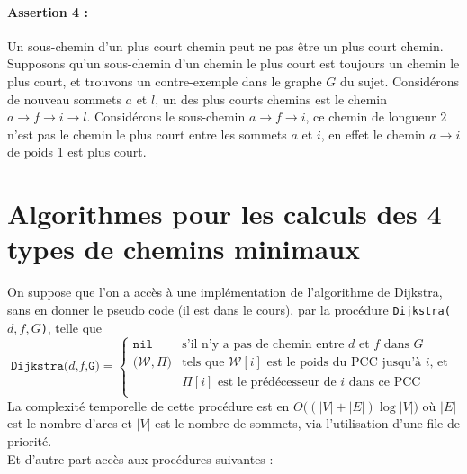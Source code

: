 \documentclass{article}
\begin{document}
\paragraph{Assertion 4 : } Un sous-chemin d'un plus court chemin peut ne pas
être un plus court chemin. \\
Supposons qu'un sous-chemin d'un chemin le plus court est toujours un chemin le
plus court, et trouvons un contre-exemple dans le graphe $G$ du sujet.
Considérons de nouveau sommets $a$ et $l$, un des plus courts chemins est le
chemin $a \rightarrow f \rightarrow i \rightarrow l$. Considérons le sous-chemin
$a \rightarrow f \rightarrow i$, ce chemin de longueur $2$ n'est pas le chemin
le plus court entre les sommets $a$ et $i$, en effet le chemin $a \rightarrow i$
de poids 1 est plus court.


\section{Algorithmes pour les calculs des 4 types de chemins minimaux}
On suppose que l'on a accès à une implémentation de l'algorithme de Dijkstra,
sans en donner le pseudo code (il est dans le cours), par la procédure
\texttt{Dijkstra($d,f,G$)}, telle que \\
\begin{equation}
    \texttt{Dijkstra($d$,$f$,G)} = \begin{cases}
    \texttt{nil} & \text{s'il n'y a pas de chemin entre $d$ et $f$ dans $G$} \\
    \big(\mathcal{W}, \Pi\big) &\text{tels que }
    \mathcal{W}[i]\text{ est le poids du PCC jusqu'à $i$, et } \\
    & \Pi[i] \text{ est le prédécesseur de $i$ dans ce PCC}\\
\end{cases}
\end{equation}
La complexité temporelle de cette procédure est en $O\big((|V|+|E|)\log|V|\big)$ où $|E|$ est
le nombre d'arcs et $|V|$ est le nombre de sommets, via l'utilisation d'une file
de priorité. \\\noindent
Et d'autre part accès aux procédures suivantes :
\end{document}
